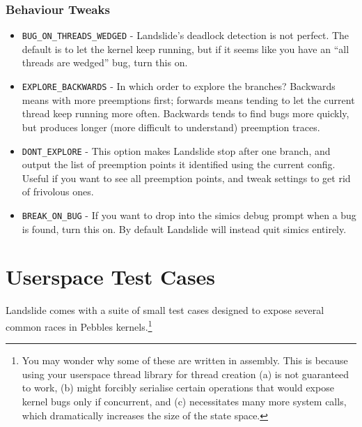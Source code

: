 \documentclass{article}
\begin{document}
\subsubsection{Behaviour Tweaks}
\begin{itemize}
	\item \texttt{BUG\_ON\_THREADS\_WEDGED} - Landslide's deadlock detection is not perfect. The default is to let the kernel keep running, but if it seems like you have an ``all threads are wedged'' bug, turn this on.
	\item \texttt{EXPLORE\_BACKWARDS} - In which order to explore the branches? Backwards means with more preemptions first; forwards means tending to let the current thread keep running more often. Backwards tends to find bugs more quickly, but produces longer (more difficult to understand) preemption traces.
	\item \texttt{DONT\_EXPLORE} - This option makes Landslide stop after one branch, and output the list of preemption points it identified using the current config. Useful if you want to see all preemption points, and tweak settings to get rid of frivolous ones.
	\item \texttt{BREAK\_ON\_BUG} - If you want to drop into the simics debug prompt when a bug is found, turn this on. By default Landslide will instead quit simics entirely.
\end{itemize}

\section{Userspace Test Cases}
\label{sec:testcase}

Landslide comes with a suite of small test cases designed to expose several common races in Pebbles kernels.\footnote{You may wonder why some of these are written in assembly.
This is because using your userspace thread library for thread creation (a) is not guaranteed to work, (b) might forcibly serialise certain operations that would expose kernel bugs only if concurrent, and (c) necessitates many more system calls, which dramatically increases the size of the state space.}
\end{document}
